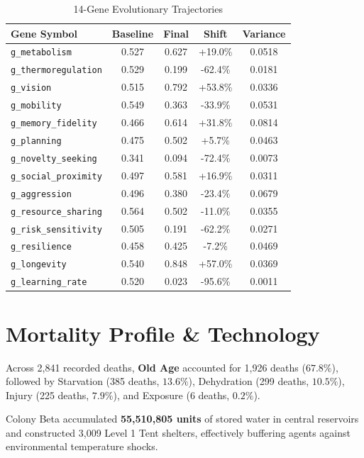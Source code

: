 \documentclass[11pt,a4paper,twocolumn]{article}
\begin{document}
\begin{table}[h]
\centering
\scriptsize
\caption{14-Gene Evolutionary Trajectories}
\begin{tabular}{lcccc}
\toprule
\textbf{Gene Symbol} & \textbf{Baseline} & \textbf{Final} & \textbf{Shift} & \textbf{Variance} \\
\midrule
\texttt{g\_metabolism} & 0.527 & 0.627 & +19.0\% & 0.0518 \\
\texttt{g\_thermoregulation} & 0.529 & 0.199 & -62.4\% & 0.0181 \\
\texttt{g\_vision} & 0.515 & 0.792 & +53.8\% & 0.0336 \\
\texttt{g\_mobility} & 0.549 & 0.363 & -33.9\% & 0.0531 \\
\texttt{g\_memory\_fidelity} & 0.466 & 0.614 & +31.8\% & 0.0814 \\
\texttt{g\_planning} & 0.475 & 0.502 & +5.7\% & 0.0463 \\
\texttt{g\_novelty\_seeking} & 0.341 & 0.094 & -72.4\% & 0.0073 \\
\texttt{g\_social\_proximity} & 0.497 & 0.581 & +16.9\% & 0.0311 \\
\texttt{g\_aggression} & 0.496 & 0.380 & -23.4\% & 0.0679 \\
\texttt{g\_resource\_sharing} & 0.564 & 0.502 & -11.0\% & 0.0355 \\
\texttt{g\_risk\_sensitivity} & 0.505 & 0.191 & -62.2\% & 0.0271 \\
\texttt{g\_resilience} & 0.458 & 0.425 & -7.2\% & 0.0469 \\
\texttt{g\_longevity} & 0.540 & 0.848 & +57.0\% & 0.0369 \\
\texttt{g\_learning\_rate} & 0.520 & 0.023 & -95.6\% & 0.0011 \\
\bottomrule
\end{tabular}
\end{table}

\section{Mortality Profile \& Technology}
Across 2,841 recorded deaths, \textbf{Old Age} accounted for 1,926 deaths ($67.8\%$), followed by Starvation (385 deaths, $13.6\%$), Dehydration (299 deaths, $10.5\%$), Injury (225 deaths, $7.9\%$), and Exposure (6 deaths, $0.2\%$).

Colony Beta accumulated \textbf{55,510,805 units} of stored water in central reservoirs and constructed 3,009 Level 1 Tent shelters, effectively buffering agents against environmental temperature shocks.
\end{document}
